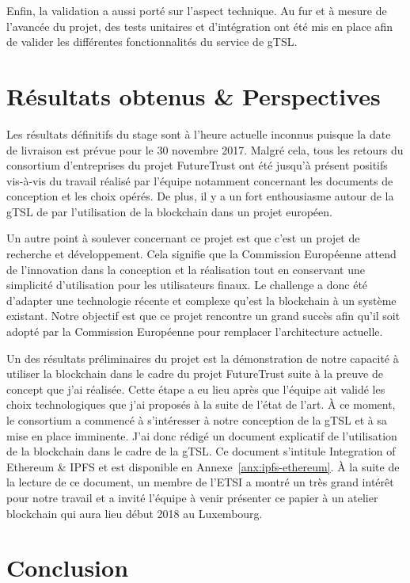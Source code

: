 \documentclass{tnreport}
\begin{document}
Enfin, la validation a aussi porté sur l'aspect technique. Au fur et à mesure de l'avancée du projet, des tests unitaires et d'intégration ont été mis en place afin de valider les différentes fonctionnalités du service de gTSL.

\chapter{Résultats obtenus \& Perspectives}

Les résultats définitifs du stage sont à l'heure actuelle inconnus puisque la date de livraison est prévue pour le 30 novembre 2017. Malgré cela, tous les retours du consortium d'entreprises du projet FutureTrust ont été jusqu'à présent positifs vis-à-vis du travail réalisé par l'équipe notamment concernant les documents de conception et les choix opérés. De plus, il y a un fort enthousiasme autour de la gTSL de par l'utilisation de la blockchain dans un projet européen.

Un autre point à soulever concernant ce projet est que c'est un projet de recherche et développement. Cela signifie que la Commission Européenne attend de l'innovation dans la conception et la réalisation tout en conservant une simplicité d'utilisation pour les utilisateurs finaux. Le challenge a donc été d'adapter une technologie récente et complexe qu'est la blockchain à un système existant. Notre objectif est que ce projet rencontre un grand succès afin qu'il soit adopté par la Commission Européenne pour remplacer l'architecture actuelle.

Un des résultats préliminaires du projet est la démonstration de notre capacité à utiliser la blockchain dans le cadre du projet FutureTrust suite à la preuve de concept que j'ai réalisée. Cette étape a eu lieu après que l'équipe ait validé les choix technologiques que j'ai proposés à la suite de l'état de l'art. À ce moment, le consortium a commencé à s'intéresser à notre conception de la gTSL et à sa mise en place imminente. J'ai donc rédigé un document explicatif de l'utilisation de la blockchain dans le cadre de la gTSL. Ce document s'intitule Integration of Ethereum \& IPFS et est disponible en Annexe~\ref{anx:ipfs-ethereum}. À la suite de la lecture de ce document, un membre de l'ETSI a montré un très grand intérêt pour notre travail et a invité l'équipe à venir présenter ce papier à un atelier blockchain qui aura lieu début 2018 au Luxembourg.

\chapter{Conclusion}
\end{document}
